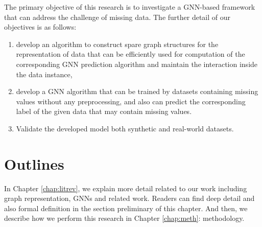 
The primary objective of this research is to investigate a GNN-based framework that can address the challenge of missing data. The further detail of our objectives is as follows:

\begin{enumerate}
	\item develop an algorithm to construct spare graph structures for the representation of data that can be efficiently used for computation of the corresponding GNN prediction algorithm and maintain the interaction inside the data instance,
	\item develop a GNN algorithm that can be trained by datasets containing missing values without any preprocessing, and also can predict the corresponding label of the given data that may contain missing values.
	\item Validate the developed model both synthetic and real-world datasets.
\end{enumerate}

\section{Outlines}
In Chapter \ref{chap:litrev}, we explain more detail related to our work including graph representation, GNNs and related work.
Readers can find deep detail and also formal definition in the section preliminary of this chapter.
And then, we describe how we perform this research in Chapter \ref{chap:meth}: methodology.

